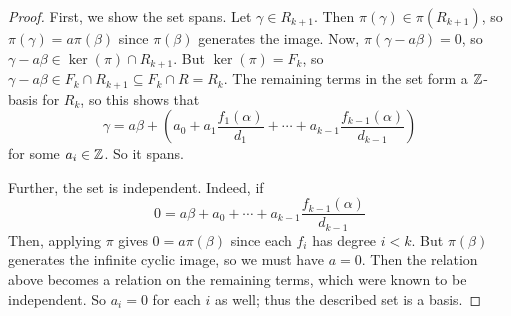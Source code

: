 \begin{proof} 
    First, we show the set spans. Let $\gamma \in R_{k+1}$. Then $\pi(\gamma) \in \pi(R_{k+1})$, so $\pi(\gamma) = a\pi(\beta)$ since $\pi(\beta)$ generates the image. Now, $\pi(\gamma-a\beta) = 0$, so $\gamma-a\beta \in \ker(\pi) \cap R_{k+1}$. But $\ker(\pi) = F_k$, so $\gamma-a\beta \in F_k \cap R_{k+1} \subseteq F_k \cap R = R_k$. The remaining terms in the set form a $\mathbb{Z}$-basis for $R_k$, so this shows that
    \[ \gamma = a\beta + \left(a_0 + a_1\frac{f_1(\alpha)}{d_1} + \cdots + a_{k-1}\frac{f_{k-1}(\alpha)}{d_{k-1}}\right) \]
    for some $a_i \in \mathbb{Z}$. So it spans.

    Further, the set is independent. Indeed, if
    \[ 0 = a\beta + a_0 + \cdots + a_{k-1}\frac{f_{k-1}(\alpha)}{d_{k-1}} \]
    Then, applying $\pi$ gives $0 = a\pi(\beta)$ since each $f_i$ has degree $i < k$. But $\pi(\beta)$ generates the infinite cyclic image, so we must have $a=0$. Then the relation above becomes a relation on the remaining terms, which were known to be independent. So $a_i = 0$ for each $i$ as well; thus the described set is a basis.
\end{proof}
